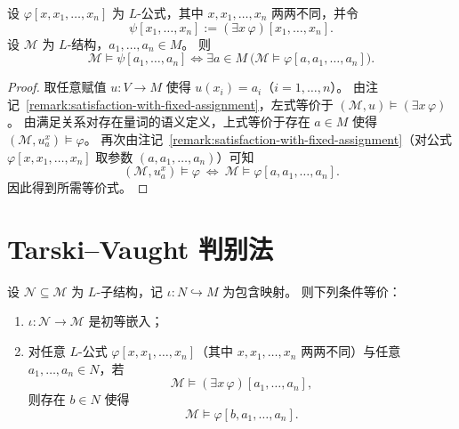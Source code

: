 \documentclass[lang=cn,a4paper,newtx,section]{elegantbook}
\begin{document}
\begin{proposition}[存在量词的参数语义]
\label{semantics-exists-with-parameters}
设 $\varphi[x,x_1,\dots,x_n]$ 为 $L$-公式，其中 $x,x_1,\dots,x_n$ 两两不同，并令
\[
  \psi[x_1,\dots,x_n]:=(\exists x\,\varphi)[x_1,\dots,x_n].
\]
设 $\mathcal M$ 为 $L$-结构，$a_1,\dots,a_n\in M$。
则
\[
  \mathcal M\models\psi[a_1,\dots,a_n]
  \Longleftrightarrow
  \exists a\in M\ \bigl(\mathcal M\models\varphi[a,a_1,\dots,a_n]\bigr).
\]
\end{proposition}

\begin{proof}
取任意赋值 $u:V\to M$ 使得 $u(x_i)=a_i$（$i=1,\dots,n$）。
由注记~\ref{remark:satisfaction-with-fixed-assignment}，左式等价于 $(\mathcal M,u)\models(\exists x\,\varphi)$。
由满足关系对存在量词的语义定义，上式等价于存在 $a\in M$ 使得 $(\mathcal M,u^{x}_{a})\models\varphi$。
再次由注记~\ref{remark:satisfaction-with-fixed-assignment}（对公式 $\varphi[x,x_1,\dots,x_n]$ 取参数 $(a,a_1,\dots,a_n)$）可知
\[
  (\mathcal M,u^{x}_{a})\models\varphi\ \Longleftrightarrow\ \mathcal M\models\varphi[a,a_1,\dots,a_n].
\]
因此得到所需等价式。
\end{proof}

\section{Tarski--Vaught 判别法}

\begin{theorem}
\label{tarski-vaught-test}
设 $\mathcal N\subseteq\mathcal M$ 为 $L$-子结构，记 $\iota:N\hookrightarrow M$ 为包含映射。
则下列条件等价：
\begin{enumerate}
  \item $\iota:\mathcal N\to\mathcal M$ 是初等嵌入；
  \item 对任意 $L$-公式 $\varphi[x,x_1,\dots,x_n]$（其中 $x,x_1,\dots,x_n$ 两两不同）与任意 $a_1,\dots,a_n\in N$，若
  \[
    \mathcal M\models(\exists x\,\varphi)[a_1,\dots,a_n],
  \]
  则存在 $b\in N$ 使得
  \[
    \mathcal M\models\varphi[b,a_1,\dots,a_n].
  \]
\end{enumerate}
\end{theorem}
\end{document}
